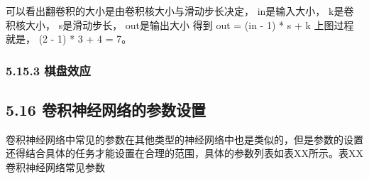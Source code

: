 可以看出翻卷积的大小是由卷积核大小与滑动步长决定， in是输入大小，
k是卷积核大小， s是滑动步长， out是输出大小 得到 out = (in - 1) * s + k
上图过程就是， (2 - 1) * 3 + 4 = 7。

\subsubsection{5.15.3 棋盘效应}\label{ux68cbux76d8ux6548ux5e94}

\subsection{5.16
卷积神经网络的参数设置}\label{ux5377ux79efux795eux7ecfux7f51ux7edcux7684ux53c2ux6570ux8bbeux7f6e}

​
卷积神经网络中常见的参数在其他类型的神经网络中也是类似的，但是参数的设置还得结合具体的任务才能设置在合理的范围，具体的参数列表如表XX所示。
​ 表XX 卷积神经网络常见参数

